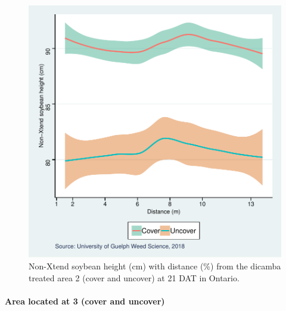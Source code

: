\documentclass[]{article}
\let\oldparagraph\paragraph
\renewcommand{\paragraph}[1]{\oldparagraph{#1}\mbox{}}
\begin{document}
\begin{figure}
\centering
\includegraphics{Report_Dicamba_study_files/figure-latex/unnamed-chunk-86-1.pdf}
\caption{Non-Xtend soybean height (cm) with distance (\%) from the
dicamba treated area 2 (cover and uncover) at 21 DAT in Ontario.}
\end{figure}

\newpage

\pagebreak

\paragraph{Area located at 3 (cover and
uncover)}\label{area-located-at-3-cover-and-uncover-1}
\end{document}
